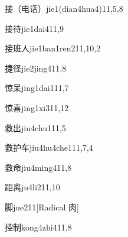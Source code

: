 \begin{verbete}{接（电话）}{jie1(dian4hua4)}{11,5,8}
\end{verbete}

\begin{verbete}{接待}{jie1dai4}{11,9}
\end{verbete}

\begin{verbete}{接班人}{jie1ban1ren2}{11,10,2}
\end{verbete}

\begin{verbete}{捷径}{jie2jing4}{11,8}
\end{verbete}

\begin{verbete}{惊呆}{jing1dai1}{11,7}
\end{verbete}

\begin{verbete}{惊喜}{jing1xi3}{11,12}
\end{verbete}

\begin{verbete}{救出}{jiu4chu1}{11,5}
\end{verbete}

\begin{verbete}{救护车}{jiu4hu4che1}{11,7,4}
\end{verbete}

\begin{verbete}{救命}{jiu4ming4}{11,8}
\end{verbete}

\begin{verbete}{距离}{ju4li2}{11,10}
\end{verbete}

\begin{verbete}{脚}{jue2}{11}[Radical 肉]
\end{verbete}

\begin{verbete}{控制}{kong4zhi4}{11,8}
\end{verbete}

